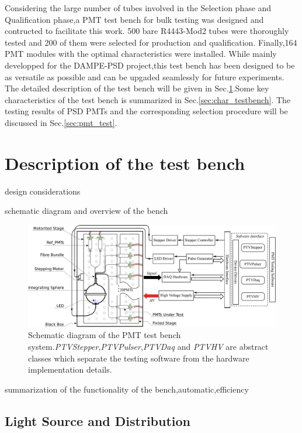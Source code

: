 \documentclass[preprint,5p,times]{elsarticle}
\begin{document}
Considering the large number of tubes involved in the Selection phase and Qualification phase,a PMT test bench for bulk testing was designed and contructed to facilitate this work.
500 bare R4443-Mod2 tubes were thoroughly tested and 200 of them were selected for production and qualification.
Finally,164 PMT modules with the optimal characteristics were installed.
While mainly developped for the DAMPE-PSD project,this test bench has been designed to be as versatile as possible and can be upgaded seamlessly for future experiments.
The detailed description of the test bench will be given in Sec.\ref{sec:description}.Some key characteristics of the test bench is summarized in Sec.\ref{sec:char_testbench}.
The testing results of PSD PMTs and the corresponding selection procedure will be discussed in Sec.\ref{sec:pmt_test}.

\section{Description of the test bench}
\label{sec:description}

design considerations

schematic diagram and overview of the bench
\begin{figure}[hb]
 \centering
 \includegraphics[width=140mm]{testbench_overview}
\caption{Schematic diagram of the PMT test bench system.\textit{PTVStepper},\textit{PTVPulser},\textit{PTVDaq} and \textit{PTVHV} are abstract classes which separate the testing software from the hardware implementation details.}
\label{fig:testbench_overveiw}
\end{figure} 

summarization of the functionality of the bench,automatic,efficiency

\subsection{Light Source and Distribution}
\label{sec:light_source}
\end{document}
